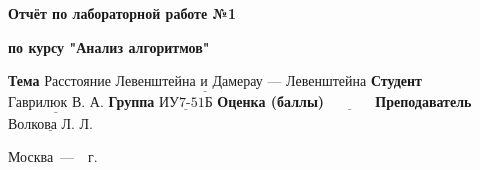 \begin{titlepage}
\begin{center}
    \Large\textbf{Отчёт по лабораторной работе №1}  
    
    \Large\textbf{по курсу "Анализ алгоритмов"}
\end{center}
\text{}\newline

\noindent\textbf{Тема} $\underline{\text{Расстояние Левенштейна и Дамерау~---~Левенштейна}}$\newline\newline\newline
\noindent\textbf{Студент} $\underline{\text{Гаврилюк В. А.}}$\newline\newline
\noindent\textbf{Группа} $\underline{\text{ИУ7-51Б}}$\newline\newline
\noindent\textbf{Оценка (баллы)} $\underline{\text{~~~~~~~~~}}$\newline\newline
\noindent\textbf{Преподаватель} $\underline{\text{Волкова Л. Л.}}$\newline

\begin{center}
    \vfill
    Москва~---~\the\year~г.
\end{center}
\restoregeometry
\end{titlepage}

\setlength{\tabcolsep}{3pt}
\newpage
\setcounter{page}{2}